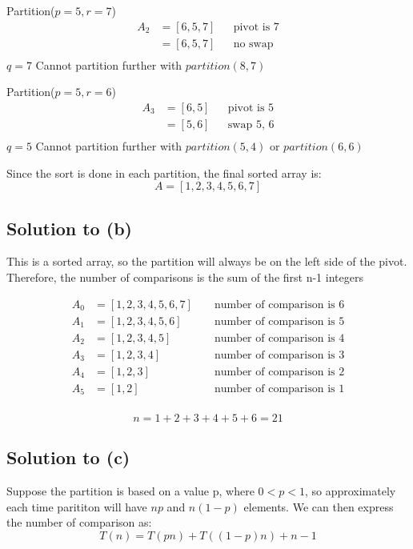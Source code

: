 \documentclass{article}
\begin{document}
Partition(\(p = 5, r = 7\))
\begin{align*}
    A_2 &= [6, 5, 7] && \text{pivot is 7} \\
    &= [6, 5, 7] && \text{no swap} \\
\end{align*}
\(q=7\) Cannot partition further with \(partition(8,7)\)

Partition(\(p = 5, r = 6\))
\begin{align*}
    A_3 &= [6, 5] && \text{pivot is 5} \\
    &= [5, 6] && \text{swap 5, 6} \\
\end{align*}
\(q=5\) Cannot partition further with \(partition(5,4)\) or \(partition(6,6)\)

Since the sort is done in each partition, the final sorted array is:
\[A = [1, 2, 3, 4, 5, 6, 7]\]

\newpage

\subsection*{Solution to (b)}

This is a sorted array, so the partition will always be on the left side of the pivot. Therefore, the number of comparisons is the sum of the first n-1 integers

\begin{align*}
A_0 &=[1, 2, 3, 4, 5, 6, 7] && \text{ number of comparison is 6} \\
A_1 &=[1, 2, 3, 4, 5, 6] && \text{ number of comparison is 5} \\
A_2 &=[1, 2, 3, 4, 5] && \text{ number of comparison is 4} \\
A_3 &=[1, 2, 3, 4] && \text{ number of comparison is 3} \\
A_4 &=[1, 2, 3] && \text{ number of comparison is 2} \\
A_5 &=[1, 2] && \text{ number of comparison is 1} \\
\end{align*}

\[
n = 1+2+3+4+5+6 = 21
\]

\newpage
\subsection*{Solution to (c)}

Suppose the partition is based on a value p, where \(0<p<1\), so approximately each time parititon will have \(np\) and \(n(1-p)\) elements. We can then express the number of comparison as:
\[T(n) = T(pn) + T((1-p)n) + n-1\]
\end{document}
